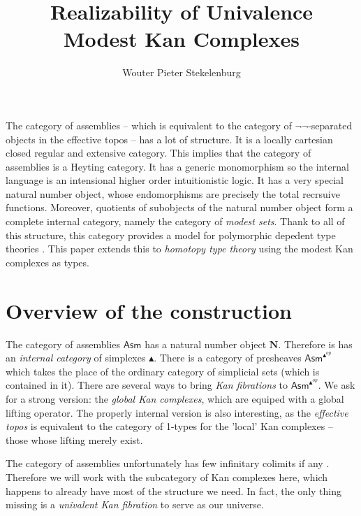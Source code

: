 \documentclass{amsart}
\title{Realizability of Univalence\\
Modest Kan Complexes}
\author[W. P. Stekelenburg]{Wouter Pieter Stekelenburg}
\theoremstyle{plain}
\theoremstyle{definition}
\newcommand\hide[1]{}
\newcommand\cat\mathcal
\begin{document}
\maketitle

The category of assemblies -- which is equivalent to the category of $\neg\neg$-separated objects in the effective topos -- has a lot of structure. It is a locally cartesian closed regular and extensive category. This implies that the category of assemblies is a Heyting category. It has a generic monomorphism so the internal language is an intensional higher order intuitionistic logic. It has a very special natural number object, whose endomorphisms are precisely the total recrsuive functions. Moreover, quotients of subobjects of the natural number object form a complete internal category, namely the category of \emph{modest sets}. Thank to all of this structure, this category provides a model for polymorphic depedent type theories \hide{cite:Jacobs1999}. This paper extends this to \emph{homotopy type theory} using the modest Kan complexes as types.

\newcommand\asm{\mathsf{Asm}}
\newcommand\nno{\mathbf{N}}
\newcommand\Simpcat{\vartriangle}
\newcommand\simpcat{\blacktriangle}
\newcommand\dual{^{op}}
\newcommand\modset{\mathsf{Mod}}
\section{Overview of the construction}
The category of assemblies $\asm$ has a natural number object $\nno$. Therefore is has an \emph{internal category} of simplexes $\simpcat$. There is a category of presheaves $\asm^{\simpcat\dual}$ \hide{cite:M&M} which takes the place of the ordinary category of simplicial sets (which is contained in it). There are several ways to bring \emph{Kan fibrations} to $\asm^{\simpcat\dual}$. We ask for a strong version: the \emph{global Kan complexes}, which are equiped with a global lifting operator. The properly internal version is also interesting, as the \emph{effective topos} is equivalent to the category of 1-types for the 'local' Kan complexes -- those whose lifting merely exist.

The category of assemblies unfortunately has few infinitary colimits if any \hide{cite:Jaap}. Therefore we will work with the subcategory of Kan complexes here, which happens to already have most of the structure we need. In fact, the only thing missing is a \emph{univalent Kan fibration} to serve as our universe.

\hide{Nu kunnen we limieten en colimieten over het hele universum pakken om fibrant replacements te vinden. Deze categorie $\modset^{\simpcat\dual}$ is namelijk ook compleet.

Om van $\cat M$ een simplical set te maken hebben we een soort inductieve colimiet nodig, maar is de category van modest sets bestaan die gewoon. We kijken naar eindige bomen van morfismes binnen de categorie $\modset^{\simpcat\dual}$. Dit kan heel goed zelf weer een soort modest Kan complex zijn.

Hoe dan ook: we moeten werken met oneindige colimieten van modest sets, want daar buiten werkt vrijwel niets.
}
\end{document}

